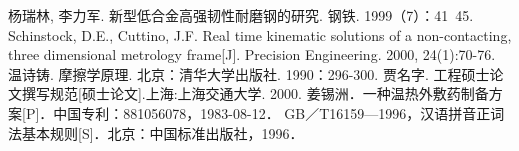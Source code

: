 \begin{thebibliography}{1}
 杨瑞林, 李力军. 新型低合金高强韧性耐磨钢的研究. 钢铁. 1999（7）：41~45.
  Schinstock, D.E., Cuttino, J.F. Real time kinematic solutions of a non-contacting, three dimensional metrology frame[J]. Precision Engineering. 2000, 24(1):70-76. 
 温诗铸. 摩擦学原理. 北京：清华大学出版社. 1990：296-300.
 贾名字. 工程硕士论文撰写规范[硕士论文].上海:上海交通大学. 2000.
 姜锡洲．一种温热外敷药制备方案[P]．中国专利：881056078，1983-08-12．
 GB／T16159—1996，汉语拼音正词法基本规则[S]．北京：中国标准出版社，1996．
\end{thebibliography}
